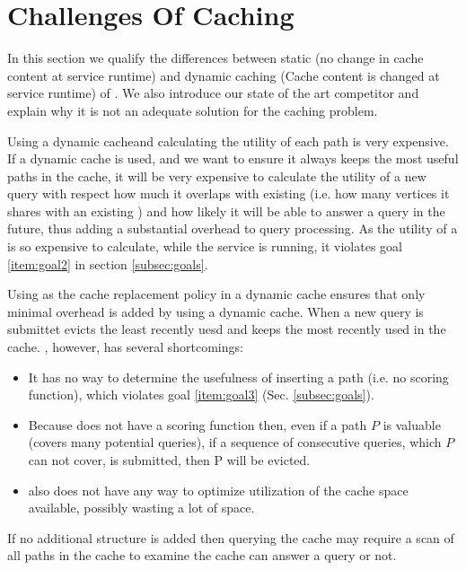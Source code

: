 \section{Challenges Of \spath Caching}\label{sec:competitors}

In this section we qualify the differences between static (no change in cache content at service runtime) and dynamic caching (Cache content is changed at service runtime) of \spathsns. We also introduce our state of the art competitor and explain why it is not an adequate solution for the \spath caching problem.


Using a dynamic cache\footnotemark and calculating the utility of each path is very expensive. If a dynamic cache is used, and we want to ensure it always keeps the most useful paths in the cache, it will be very expensive to calculate the utility of a new query with respect how much it overlaps with existing \spaths (i.e. how many vertices it shares with an existing \spathns) and how likely it will be able to answer a query in the future, thus adding a substantial overhead to query processing. As the utility of a \spath is so expensive to calculate, while the \spath service is running, it violates goal \ref{item:goal2} in section \ref{subsec:goals}.

Using \lru as the cache replacement policy in a dynamic cache ensures that only minimal overhead is added by using a dynamic cache. When a new query is submittet \lru evicts the least recently uesd \spath and keeps the most recently used \spaths in the cache.
\lru, however, has several shortcomings: 
\begin{itemize}
\item It has no way to determine the usefulness of inserting a path (i.e. no scoring function), which violates goal \ref{item:goal3} (Sec. \ref{subsec:goals}). 
\item Because \lru does not have a scoring function then, even if a path $P$ is valuable (covers many potential queries), if a sequence of consecutive queries, which $P$ can not cover, is submitted, then P will be evicted. 
\item \lru also does not have any way to optimize utilization of the cache space available, possibly wasting a lot of space. 
\end{itemize}

If no additional structure is added then querying the cache may require a scan of all paths in the cache to examine the cache can answer a query or not.



